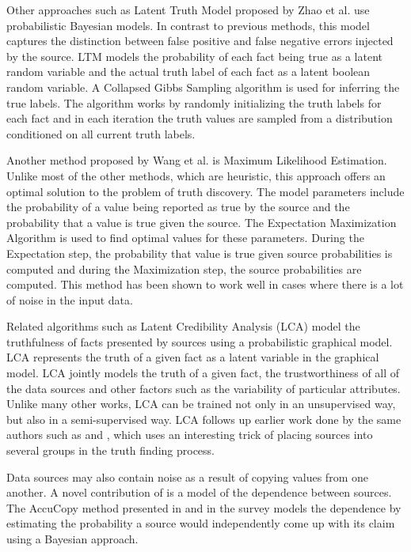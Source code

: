 \documentclass{acm_proc_article-sp}
\begin{document}
Other approaches such as Latent Truth Model proposed by Zhao et al. \cite{zhao:bayesian} use probabilistic Bayesian models. In contrast to previous methods, this model captures the distinction between false positive and false negative errors injected by the source. LTM models the probability of each fact being true as a latent random variable and the actual truth label of each fact as a latent boolean random variable. A Collapsed Gibbs Sampling algorithm is used for inferring the true labels. The algorithm works by randomly initializing the truth labels for each fact and in each iteration the truth values are sampled from a distribution conditioned on all current truth labels. 

Another method proposed by Wang et al. \cite{wang2012truth} is Maximum Likelihood Estimation. Unlike most of the other methods, which are heuristic, this approach offers an optimal solution to the problem of truth discovery. The model parameters include the probability of a value being reported as true by the source and the probability that a value is true given the source. The Expectation Maximization Algorithm is used to find optimal values for these parameters. During the Expectation step, the probability that value is true given source probabilities is computed and during the Maximization step, the source probabilities are computed. This method has been shown to work well in cases where there is a lot of noise in the input data. 

Related algorithms such as Latent Credibility Analysis (LCA) \cite{pasternack:latent} model the truthfulness of facts presented by sources using a probabilistic graphical model. LCA represents the truth of a given fact as a latent variable in the graphical model. LCA jointly models the truth of a given fact, the trustworthiness of all of the data sources and other factors such as the variability of particular attributes. Unlike many other works, LCA can be trained not only in an unsupervised way, but also in a semi-supervised way. LCA follows up earlier work done by the same authors such as \cite{pasternack:knowing} and \cite{pasternack:making}, which uses an interesting trick of placing sources into several groups in the truth finding process. 


Data sources may also contain noise as a result of copying values from one another. A novel contribution of \cite{dong:integrating} is a model of the dependence between sources. The {\sc AccuCopy} method presented in \cite{dong:integrating} and in the survey \cite{li:truth} models the dependence by estimating the probability a source would independently come up with its claim using a Bayesian approach. 
\end{document}
